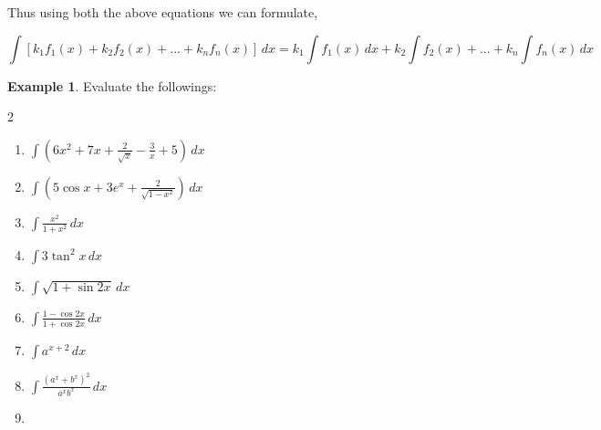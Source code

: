 \documentclass{book}
\theoremstyle{definition}
\newtheorem{example}{Example}[section]
\begin{document}
Thus using both the above equations we can formulate,

\[
\int [k_1f_1(x)+k_2f_2(x)+...+k_nf_n(x)] \, dx=k_1\int f_1(x) \, dx+k_2\int f_2(x)+...+k_n\int f_n(x) \, dx
\]

\begin{example}
Evaluate the followings:
\begin{multicols}{2}

\begin{enumerate}[label=(\roman*)]
    \item $\displaystyle\int \left(6x^2+7x+\frac{2}{\sqrt{x}}-\frac{3}{x}+5\right) \, dx$
    \item $\displaystyle\int\left(5\cos x+3e^x+\frac{2}{\sqrt{1-x^2}}\right) \, dx$
    \item $\displaystyle\int \frac{x^2}{1+x^2} \, dx$
    \item $\displaystyle\int3\tan^2 x \, dx$
    \item $\displaystyle\int \sqrt{1+\sin 2x} \, dx$
    \item $\displaystyle\int\frac{1-\cos 2x}{1+\cos 2x} \, dx$
    \item $\displaystyle\int a^{x+2} \, dx$
    \item $\displaystyle\int \frac{(a^x+b^x)^2}{a^xb^x} \, dx$
    \item[] \phantom{x}
\end{enumerate}
\end{multicols}    
\end{example}
\end{document}
